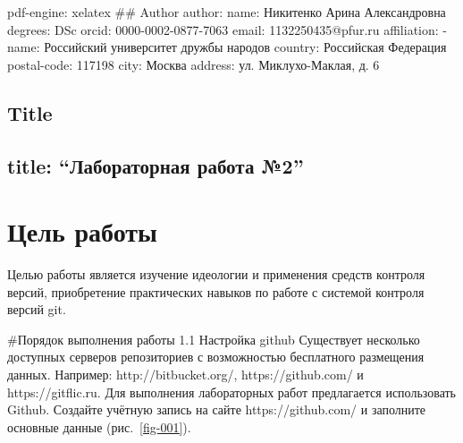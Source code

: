 \documentclass[
  english,
  russian,
  12pt,
  a4paper,
  DIV=11,
  numbers=noendperiod]{scrreprt}
\author{}
\date{}
\renewcommand*\contentsname{Содержание}
\newcommand\contentsname{Содержание}
\begin{document}
\renewcommand*\contentsname{Содержание}
{
\setcounter{tocdepth}{1}
\tableofcontents
}
\listoffigures
\listoftables

pdf-engine: xelatex \#\# Author author: name: Никитенко Арина
Александровна degrees: DSc orcid: 0000-0002-0877-7063 email:
1132250435@pfur.ru affiliation: - name: Российский университет дружбы
народов country: Российская Федерация postal-code: 117198 city: Москва
address: ул. Миклухо-Маклая, д. 6

\section{Title}\label{title}

\section{\texorpdfstring{title: \enquote{Лабораторная работа
№2}}{title: ``Лабораторная работа №2''}}\label{title-ux43bux430ux431ux43eux440ux430ux442ux43eux440ux43dux430ux44f-ux440ux430ux431ux43eux442ux430-2}

\chapter{Цель
работы}\label{ux446ux435ux43bux44c-ux440ux430ux431ux43eux442ux44b}

Целью работы является изучение идеологии и применения средств контроля
версий, приобретение практических навыков по работе с системой контроля
версий git.

\#Порядок выполнения работы 1.1 Настройка github Существует несколько
доступных серверов репозиториев с возможностью бесплатного размещения
данных. Например: http://bitbucket.org/, https://github.com/ и
https://gitflic.ru. Для выполнения лабораторных работ предлагается
использовать Github. Создайте учётную запись на сайте
https://github.com/ и заполните основные данные (рис.~\ref{fig-001}).
\end{document}
